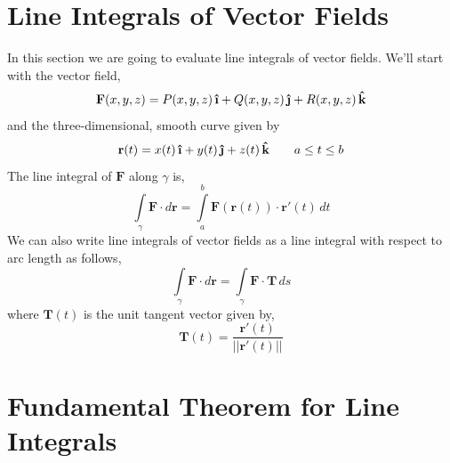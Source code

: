 \documentclass[10pt,reqno]{book}
\theoremstyle{definition}
\renewcommand{\vec}[1]{\mathbf{#1}}
\newcommand{\uvec}[1]{\boldsymbol{\hat{\textbf{#1}}}}
\begin{document}
	\section{Line Integrals of Vector Fields}
	
	In this section we are going to evaluate line integrals of vector fields. We'll start with the vector field,
	\[ \vec{F}(x,y,z) = P(x,y,z)\,\uvec{\i} + Q(x,y,z)\,\uvec{\j} + R(x,y,z)\,\uvec{k} \]
	and the three-dimensional, smooth curve given by
	\[ \vec{r}(t) = x(t)\,\uvec{\i} + y(t)\,\uvec{\j} + z(t)\,\uvec{k} \qquad a \leq t \leq b \]
	The line integral of $ \vec{F} $ along $ \gamma $ is,
	\[ \int\limits_{\gamma} \vec{F} \cdot d\vec{r} = \int\limits_a^b \vec{F}(\vec{r}(t)) \cdot \vec{r}'(t)\,dt \]
	We can also write line integrals of vector fields as a line integral with respect to arc length as follows,
	\[ \int\limits_{\gamma} \vec{F} \cdot d\vec{r} = \int\limits_{\gamma} \vec{F} \cdot \vec{T}\,ds \]
	where $ \vec{T}(t) $ is the unit tangent vector given by,
	\[ \vec{T}(t) = \frac{\vec{r}'(t)}{||\vec{r}'(t) ||} \]
	
	\section{Fundamental Theorem for Line Integrals}
	
\end{document}
